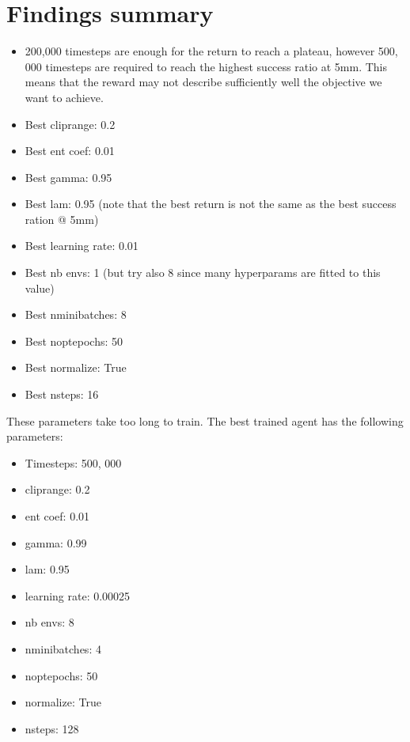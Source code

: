 \documentclass{article}
\begin{document}
\section{Findings summary}


\begin{itemize}
  \item 200,000 timesteps are enough for the return to reach a plateau, however 500, 000 timesteps are required to reach the highest success ratio at 5mm. This means that the reward may not describe sufficiently well the objective we want to achieve.
  \item Best cliprange: 0.2
  \item Best ent coef: 0.01
  \item Best gamma: 0.95
  \item Best lam: 0.95 (note that the best return is not the same as the best success ration @ 5mm)
  \item Best learning rate: 0.01
  \item Best nb envs: 1 (but try also 8 since many hyperparams are fitted to this value)
  \item Best nminibatches: 8
  \item Best noptepochs: 50
  \item Best normalize: True
  \item Best nsteps: 16
\end{itemize} 


These parameters take too long to train. The best trained agent has the following parameters:

\begin{itemize}
  \item Timesteps: 500, 000
  \item cliprange: 0.2
  \item ent coef: 0.01
  \item gamma: 0.99
  \item lam: 0.95
  \item learning rate: 0.00025
  \item nb envs: 8
  \item nminibatches: 4
  \item noptepochs: 50
  \item normalize: True
  \item nsteps: 128
\end{itemize} 
\end{document}
